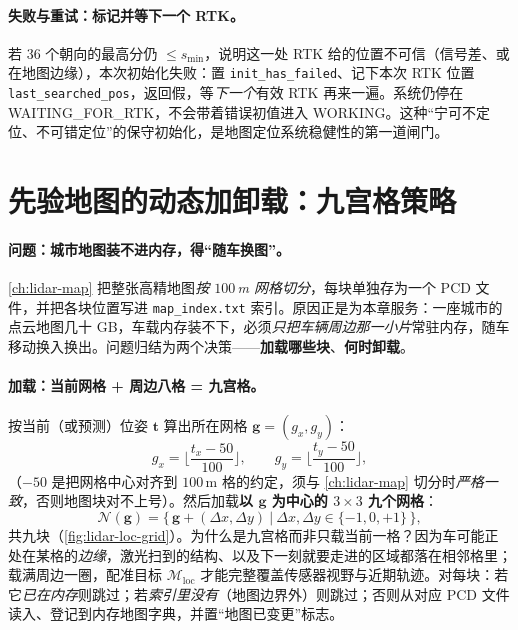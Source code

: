 \paragraph{失败与重试：标记并等下一个 RTK。}
若 $36$ 个朝向的最高分仍 $\le s_{\min}$，说明这一处 RTK 给的位置不可信（信号差、或在地图边缘），本次初始化失败：置 \texttt{init\_has\_failed}、记下本次 RTK 位置 \texttt{last\_searched\_pos}，返回假，等\emph{下一个}有效 RTK 再来一遍。系统仍停在 \textsf{WAITING\_FOR\_RTK}，不会带着错误初值进入 \textsf{WORKING}。这种“宁可不定位、不可错定位”的保守初始化，是地图定位系统稳健性的第一道闸门。

\section{先验地图的动态加卸载：九宫格策略}
\label{sec:lidar-loc-mapload}

\paragraph{问题：城市地图装不进内存，得“随车换图”。}
\cref{ch:lidar-map} 把整张高精地图\emph{按 $100$\,m 网格切分}，每块单独存为一个 PCD 文件，并把各块位置写进 \texttt{map\_index.txt} 索引。原因正是为本章服务：一座城市的点云地图几十 GB，车载内存装不下，必须\emph{只把车辆周边那一小片}常驻内存，随车移动换入换出。问题归结为两个决策——\textbf{加载哪些块}、\textbf{何时卸载}。

\paragraph{加载：当前网格 + 周边八格 = 九宫格。}
按当前（或预测）位姿 $\mathbf t$ 算出所在网格 $\mathbf g=(g_x,g_y)$：
\begin{equation}
  g_x=\Big\lfloor\frac{t_x-50}{100}\Big\rfloor,\qquad
  g_y=\Big\lfloor\frac{t_y-50}{100}\Big\rfloor,
  \label{eq:lidar-loc-grid}
\end{equation}
（$-50$ 是把网格中心对齐到 $100$\,m 格的约定，须与 \cref{ch:lidar-map} 切分时\emph{严格一致}，否则地图块对不上号）。然后加载\textbf{以 $\mathbf g$ 为中心的 $3\times3$ 九个网格}：
\begin{equation}
  \mathcal N(\mathbf g)=\big\{\,\mathbf g+(\Delta x,\Delta y)\ \big|\ \Delta x,\Delta y\in\{-1,0,+1\}\,\big\},
  \label{eq:lidar-loc-nine}
\end{equation}
共九块（\cref{fig:lidar-loc-grid}）。为什么是九宫格而非只载当前一格？因为车可能正处在某格的\emph{边缘}，激光扫到的结构、以及下一刻就要走进的区域都落在相邻格里；载满周边一圈，配准目标 $\mathcal M_{\mathrm{loc}}$ 才能完整覆盖传感器视野与近期轨迹。对每块：若它\emph{已在内存}则跳过；若\emph{索引里没有}（地图边界外）则跳过；否则从对应 PCD 文件读入、登记到内存地图字典，并置“地图已变更”标志。

